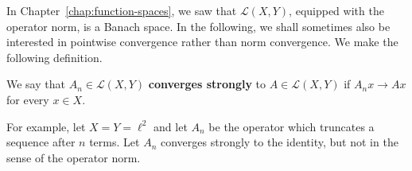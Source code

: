 In Chapter~\ref{chap:function-spaces}, we saw that $\mathcal{L}(X,Y)$, equipped with the operator norm, is a Banach space. In the following, we shall sometimes also be interested in pointwise convergence rather than norm convergence. We make the following definition.

\begin{Definition}
\label{def:operator-strong-convergence}
We say that $A_n\in\mathcal{L}(X,Y)$ \textbf{converges strongly} to $A\in\mathcal{L}(X,Y)$ if $A_nx\to Ax$ for every $x\in X$.
\end{Definition}

For example, let $X=Y=\ell^2$ and let $A_n$ be the operator which truncates a sequence after $n$ terms. Let $A_n$ converges strongly to the identity, but not in the sense of the operator norm.
